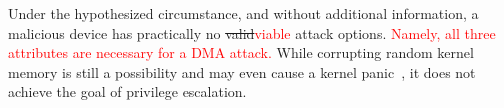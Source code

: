 Under the hypothesized circumstance, and without additional information, a malicious device has practically no \sout{valid}\textcolor{red}{viable} attack options.
\textcolor{red}{Namely, all three attributes are necessary for a DMA attack.}
While corrupting random kernel memory is still a possibility and may even cause a kernel panic~\cite{MMT16}, it does not achieve the goal of privilege escalation.
